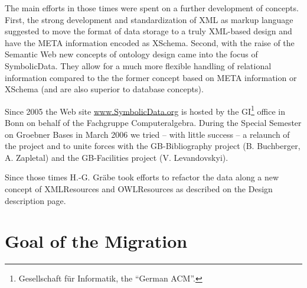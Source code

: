 \documentclass[11pt,a4paper]{article}
\begin{document}
The main efforts in those times were spent on a further development of
concepts. First, the strong development and standardization of XML as markup
language suggested to move the format of data storage to a truly XML-based
design and have the META information encoded as XSchema. Second, with the
raise of the Semantic Web new concepts of ontology design came into the focus
of SymbolicData. They allow for a much more flexible handling of relational
information compared to the the former concept based on META information or
XSchema (and are also superior to database concepts).

Since 2005 the Web site \url{www.SymbolicData.org} is hosted by the
GI\footnote{Gesellschaft f\"ur Informatik, the ``German ACM''.}  office in
Bonn on behalf of the Fachgruppe Computeralgebra. During the Special Semester
on Groebner Bases in March 2006 we tried -- with little success -- a relaunch
of the project and to unite forces with the GB-Bibliography project
(B. Buchberger, A. Zapletal) and the GB-Facilities project (V. Levandovskyi).

Since those times H.-G. Gräbe took efforts to refactor the data along a new
concept of XMLResources and OWLResources as described on the Design
description page.


\section{Goal of the Migration}
\end{document}
